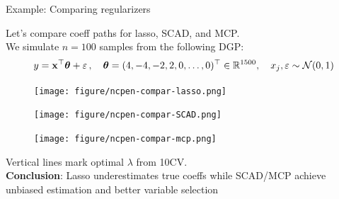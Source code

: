 \documentclass[11pt,compress,t,notes=noshow, xcolor=table]{beamer}
\begin{document}
\begin{vbframe}{Example: Comparing regularizers}

Let's compare coeff paths for lasso, SCAD, and MCP.\\
\vspace{0.15cm}
We simulate $n=100$ samples from the following DGP:
{\small
$$y = \mathbf{x}^{\top} \bm{\theta} + \varepsilon\,,\quad \bm{\theta} =(4,-4,-2,2,0,\ldots,0)^{\top} \in \mathbb{R}^{1500}, \quad x_j,\varepsilon \sim \mathcal{N}(0,1)$$
}
\vspace{-1cm}

  \begin{figure}[h]
    \begin{minipage}{0.32\linewidth}
      \vspace{3pt}
      \centerline{\texttt{[image: figure/ncpen-compar-lasso.png]}}
    \end{minipage}
    \begin{minipage}{0.32\linewidth}
      \vspace{3pt}
      \centerline{\texttt{[image: figure/ncpen-compar-SCAD.png]}}
    \end{minipage}
    \begin{minipage}{0.32\linewidth}
      \vspace{3pt}
      \centerline{\texttt{[image: figure/ncpen-compar-mcp.png]}}
    \end{minipage}
  \end{figure}
Vertical lines mark optimal $\lambda$ from 10CV.\\
\vspace{0.1cm}
\textbf{Conclusion}: Lasso underestimates true coeffs while SCAD/MCP achieve unbiased estimation and better variable selection

\end{vbframe}
\end{document}
